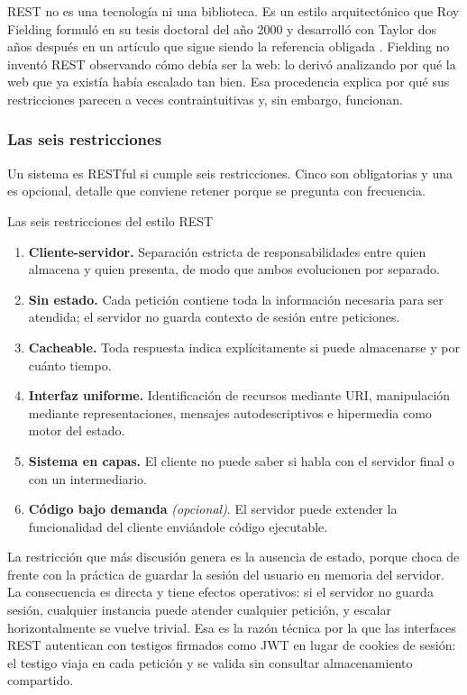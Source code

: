 \documentclass[11pt,a4paper,openany]{book}
\begin{document}
REST no es una tecnología ni una biblioteca. Es un estilo arquitectónico que Roy Fielding formuló en su tesis doctoral del año 2000 \cite{fielding2000rest} y desarrolló con Taylor dos años después en un artículo que sigue siendo la referencia obligada \cite{fielding2002principled}. Fielding no inventó REST observando cómo debía ser la web: lo derivó analizando por qué la web que ya existía había escalado tan bien. Esa procedencia explica por qué sus restricciones parecen a veces contraintuitivas y, sin embargo, funcionan.

\subsubsection{Las seis restricciones}

Un sistema es RESTful si cumple seis restricciones. Cinco son obligatorias y una es opcional, detalle que conviene retener porque se pregunta con frecuencia.

\begin{cajadefinicion}{Las seis restricciones del estilo REST}
	\begin{enumerate}
		\item \textbf{Cliente-servidor.} Separación estricta de responsabilidades entre quien almacena y quien presenta, de modo que ambos evolucionen por separado.
		\item \textbf{Sin estado.} Cada petición contiene toda la información necesaria para ser atendida; el servidor no guarda contexto de sesión entre peticiones.
		\item \textbf{Cacheable.} Toda respuesta indica explícitamente si puede almacenarse y por cuánto tiempo.
		\item \textbf{Interfaz uniforme.} Identificación de recursos mediante URI, manipulación mediante representaciones, mensajes autodescriptivos e hipermedia como motor del estado.
		\item \textbf{Sistema en capas.} El cliente no puede saber si habla con el servidor final o con un intermediario.
		\item \textbf{Código bajo demanda} \emph{(opcional)}. El servidor puede extender la funcionalidad del cliente enviándole código ejecutable.
	\end{enumerate}
\end{cajadefinicion}

La restricción que más discusión genera es la ausencia de estado, porque choca de frente con la práctica de guardar la sesión del usuario en memoria del servidor. La consecuencia es directa y tiene efectos operativos: si el servidor no guarda sesión, cualquier instancia puede atender cualquier petición, y escalar horizontalmente se vuelve trivial. Esa es la razón técnica por la que las interfaces REST autentican con testigos firmados como JWT \cite{jones2015jwt} en lugar de cookies de sesión: el testigo viaja en cada petición y se valida sin consultar almacenamiento compartido.
\end{document}
